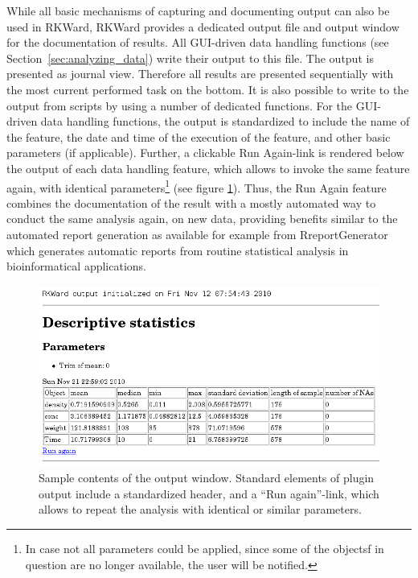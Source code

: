 While all basic mechanisms of
capturing and documenting  output can also
be used in RKWard, RKWard provides a dedicated output file and output
window for the documentation of results. All GUI-driven data handling
functions (see Section~\ref{sec:analyzing_data}) write their output to this file. 
The output is presented as journal view. Therefore all results are presented
sequentially with the most current performed task on the bottom.
It is also possible to write to the output from 
scripts by using a number of dedicated 
functions. For the GUI-driven data handling functions, the output is
standardized to include the name of the feature, the date and time of
the execution of the feature, and other basic parameters (if
applicable). Further, a clickable Run
Again-link is rendered below the output of each data
handling feature, which allows to invoke the same feature again, with
identical parameters\footnote{In case not all parameters could be
applied, since some of the  objectsf in
question are no longer available, the user will be notified.} (see
figure \ref{fig:results_output}). Thus, the Run
Again feature combines the documentation of the result
with a mostly automated way to conduct the same analysis again, on new
data, providing benefits similar to the automated report generation as
available for example from RreportGenerator
\citep{RaffelsbergerW2008} which generates automatic
reports from routine statistical analysis in bioinformatical
applications.

\begin{figure}[htp]
 \centering
 \includegraphics{../figures/results_output_cropped.png}
 \caption{Sample contents of the output window. Standard elements of plugin output include
 a standardized header, and a ``Run again''-link, which allows to repeat the analysis with
 identical or similar parameters.}
 \label{fig:results_output}
\end{figure}

